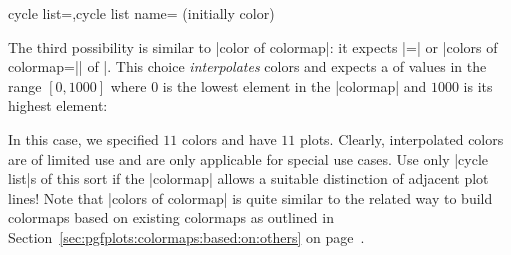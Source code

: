 \begin{pgfplotskeylist}{cycle list=,cycle list name= (initially color)}
{    The third possibility is similar to |color of colormap|: it expects
    |=| or
    |colors of colormap=|| of |. This choice
    \emph{interpolates} colors and expects a  of values in the range
    $[0,1000]$ where $0$ is the lowest element in the |colormap| and $1000$ is
    its highest element:
\begin{codeexample}[]
\end{codeexample}
    In this case, we specified $11$ colors and have $11$ plots. Clearly,
    interpolated colors are of limited use and are only applicable for special
    use cases. Use only |cycle list|s of this sort if the |colormap| allows a
    suitable distinction of adjacent plot lines! Note that |colors of colormap|
    is quite similar to the related way to build colormaps based on existing
    colormaps as outlined in
    Section~\ref{sec:pgfplots:colormaps:based:on:others} on
    page~\pageref{sec:pgfplots:colormaps:based:on:others}.

}
\end{pgfplotskeylist}

